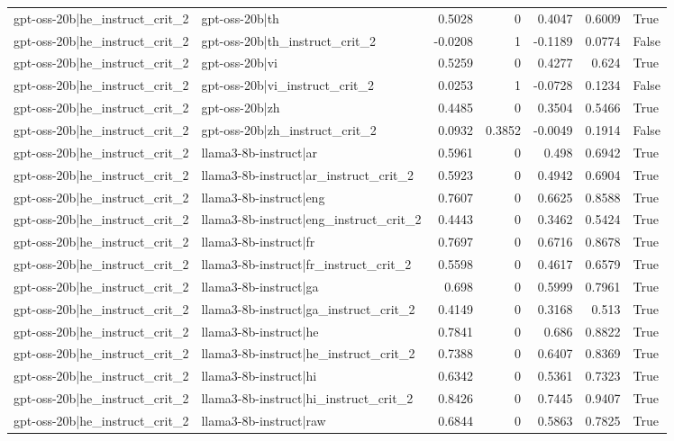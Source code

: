 \begin{table}
\begin{tabular}{l l r r r r l}
gpt-oss-20b|he_instruct_crit_2 & gpt-oss-20b|th & 0.5028 & 0 & 0.4047 & 0.6009 & True \\
gpt-oss-20b|he_instruct_crit_2 & gpt-oss-20b|th_instruct_crit_2 & -0.0208 & 1 & -0.1189 & 0.0774 & False \\
gpt-oss-20b|he_instruct_crit_2 & gpt-oss-20b|vi & 0.5259 & 0 & 0.4277 & 0.624 & True \\
gpt-oss-20b|he_instruct_crit_2 & gpt-oss-20b|vi_instruct_crit_2 & 0.0253 & 1 & -0.0728 & 0.1234 & False \\
gpt-oss-20b|he_instruct_crit_2 & gpt-oss-20b|zh & 0.4485 & 0 & 0.3504 & 0.5466 & True \\
gpt-oss-20b|he_instruct_crit_2 & gpt-oss-20b|zh_instruct_crit_2 & 0.0932 & 0.3852 & -0.0049 & 0.1914 & False \\
gpt-oss-20b|he_instruct_crit_2 & llama3-8b-instruct|ar & 0.5961 & 0 & 0.498 & 0.6942 & True \\
gpt-oss-20b|he_instruct_crit_2 & llama3-8b-instruct|ar_instruct_crit_2 & 0.5923 & 0 & 0.4942 & 0.6904 & True \\
gpt-oss-20b|he_instruct_crit_2 & llama3-8b-instruct|eng & 0.7607 & 0 & 0.6625 & 0.8588 & True \\
gpt-oss-20b|he_instruct_crit_2 & llama3-8b-instruct|eng_instruct_crit_2 & 0.4443 & 0 & 0.3462 & 0.5424 & True \\
gpt-oss-20b|he_instruct_crit_2 & llama3-8b-instruct|fr & 0.7697 & 0 & 0.6716 & 0.8678 & True \\
gpt-oss-20b|he_instruct_crit_2 & llama3-8b-instruct|fr_instruct_crit_2 & 0.5598 & 0 & 0.4617 & 0.6579 & True \\
gpt-oss-20b|he_instruct_crit_2 & llama3-8b-instruct|ga & 0.698 & 0 & 0.5999 & 0.7961 & True \\
gpt-oss-20b|he_instruct_crit_2 & llama3-8b-instruct|ga_instruct_crit_2 & 0.4149 & 0 & 0.3168 & 0.513 & True \\
gpt-oss-20b|he_instruct_crit_2 & llama3-8b-instruct|he & 0.7841 & 0 & 0.686 & 0.8822 & True \\
gpt-oss-20b|he_instruct_crit_2 & llama3-8b-instruct|he_instruct_crit_2 & 0.7388 & 0 & 0.6407 & 0.8369 & True \\
gpt-oss-20b|he_instruct_crit_2 & llama3-8b-instruct|hi & 0.6342 & 0 & 0.5361 & 0.7323 & True \\
gpt-oss-20b|he_instruct_crit_2 & llama3-8b-instruct|hi_instruct_crit_2 & 0.8426 & 0 & 0.7445 & 0.9407 & True \\
gpt-oss-20b|he_instruct_crit_2 & llama3-8b-instruct|raw & 0.6844 & 0 & 0.5863 & 0.7825 & True \\

\end{tabular}
\end{table}
